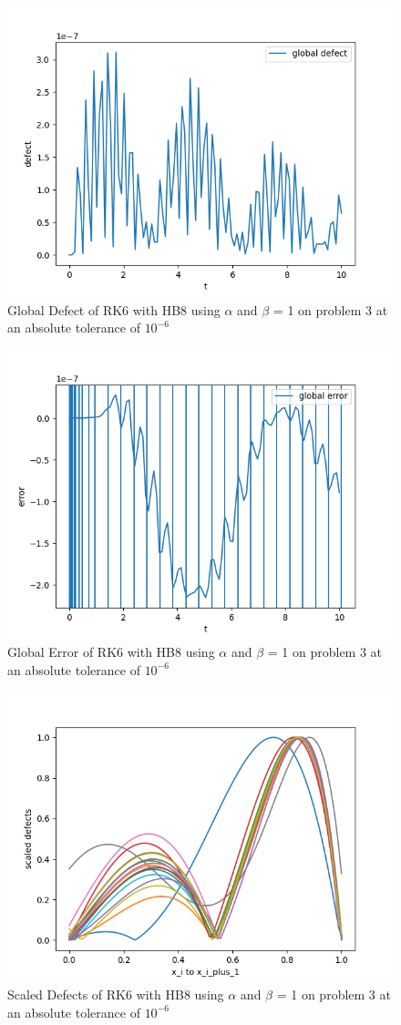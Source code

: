 \documentclass{article}
\begin{document}
\begin{figure}[H]
\centering
\includegraphics[width=0.7\linewidth]{./figures/static_alpha_rk4_with_hb6_p3_global_defect}
\caption{Global Defect of RK6 with HB8 using $\alpha$ and $\beta$ = 1 on problem 3 at an absolute tolerance of $10^{-6}$}
\label{fig:static_alpha_rk6_with_hb8_p3_global_defect}
\end{figure}

\begin{figure}[H]
\centering
\includegraphics[width=0.7\linewidth]{./figures/static_alpha_rk6_with_hb8_p3_global_error}
\caption{Global Error of RK6 with HB8 using $\alpha$ and $\beta$ = 1 on problem 3 at an absolute tolerance of $10^{-6}$}
\label{fig:static_alpha_rk6_with_hb8_p3_global_error}
\end{figure}

\begin{figure}[H]
\centering
\includegraphics[width=0.7\linewidth]{./figures/static_alpha_rk6_with_hb8_p3_scaled_defects}
\caption{Scaled Defects of RK6 with HB8 using $\alpha$ and $\beta$ = 1 on problem 3 at an absolute tolerance of $10^{-6}$}
\label{fig:static_alpha_rk6_with_hb8_p3_scaled_defects}
\end{figure}
\end{document}
